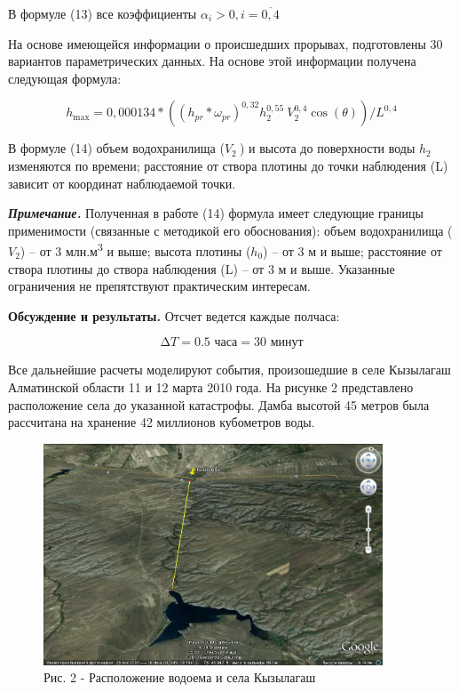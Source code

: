 В формуле (13) все коэффициенты
\(\alpha_{i}>0,i=\overline{0,4}\)

На основе имеющейся информации о происшедших прорывах, подготовлены 30
вариантов параметрических данных. На основе этой информации получена
следующая формула:

\begin{equation}
h_{\max} = 0,000134*(\left( h_{pr}*\omega_{pr} \right)^{0,32}h_{2}^{0,55}\ V_{2}^{0,4}\cos(\theta))/L^{0,4}
\end{equation}

\begin{multicols}{2}
В формуле (14) объем водохранилища (\(V_{2}\ \)) и высота до поверхности
воды \(h_{2}\) изменяются по времени; расстояние от створа плотины до
точки наблюдения (L) зависит от координат наблюдаемой точки.

\emph{{\bfseries Примечание.}} Полученная в работе (14) формула имеет
следующие границы применимости (связанные с методикой его обоснования):
объем водохранилища (\(V_{2}\)) -- от 3 млн.м\textsuperscript{3} и выше;
высота плотины (\(h_{0}\)) -- от 3 м и выше; расстояние от створа
плотины до створа наблюдения (L) -- от 3 м и выше. Указанные ограничения
не препятствуют практическим интересам.

{\bfseries Обсуждение и результаты.} Отсчет ведется каждые полчаса:

\[\mathrm{\Delta}T = 0.5 \text{ часа} = 30 \text{ минут}\]

Все дальнейшие расчеты моделируют события, произошедшие в селе Кызылагаш
Алматинской области 11 и 12 марта 2010 года. На рисунке 2 представлено
расположение села до указанной катастрофы. Дамба высотой 45 метров была
рассчитана на хранение 42 миллионов кубометров воды.
\end{multicols}

\begin{figure}[H]
	\centering
	\includegraphics[width=0.9\textwidth]{media/ict/image3}
	\caption*{Рис. 2 - Расположение водоема и села Кызылагаш}
\end{figure}

